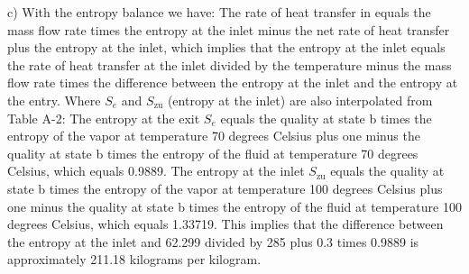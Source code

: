 c) With the entropy balance we have:
The rate of heat transfer in equals the mass flow rate times the entropy at the inlet minus the net rate of heat transfer plus the entropy at the inlet, which implies that the entropy at the inlet equals the rate of heat transfer at the inlet divided by the temperature minus the mass flow rate times the difference between the entropy at the inlet and the entropy at the entry.
Where \(S_e\) and \(S_{\text{zu}}\) (entropy at the inlet) are also interpolated from Table A-2:
The entropy at the exit \(S_e\) equals the quality at state b times the entropy of the vapor at temperature 70 degrees Celsius plus one minus the quality at state b times the entropy of the fluid at temperature 70 degrees Celsius, which equals 0.9889.
The entropy at the inlet \(S_{\text{zu}}\) equals the quality at state b times the entropy of the vapor at temperature 100 degrees Celsius plus one minus the quality at state b times the entropy of the fluid at temperature 100 degrees Celsius, which equals 1.33719.
This implies that the difference between the entropy at the inlet and 62.299 divided by 285 plus 0.3 times 0.9889 is approximately 211.18 kilograms per kilogram.